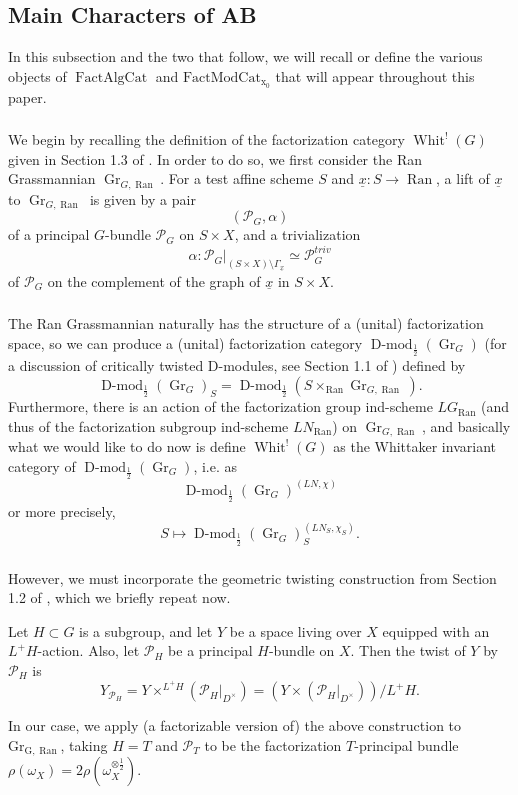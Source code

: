 \documentclass[10pt,a4paper]{amsart}
\newcommand{\on}[1]{\operatorname{#1}}
\newcommand{\Dmod}{\on{D-mod}}
\newcommand{\FactAlgCat}{\on{FactAlgCat}}
\newcommand{\FactModCat}{\on{FactModCat_{x_0}}}
\newcommand{\sssec}[1]{\subsubsection{}}
\begin{document}
\subsection{Main Characters of AB} \label{Main Characters of AB}
In this subsection and the two that follow, we will recall or define the various objects of $\FactAlgCat$ and $\FactModCat$ that will appear throughout this paper.

\sssec{}
We begin by recalling the definition of the factorization category $\on{Whit}^!(G)$ given in Section 1.3 of \cite{GLC2}. In order to do so, we first consider the Ran Grassmannian $\on{Gr}_{G, \on{Ran}}$. For a test affine scheme $S$ and $\underline{x} : S \to \on{Ran}$, a lift of $\underline{x}$ to $\on{Gr}_{G, \on{Ran}}$ is given by a pair
$$
(\mathcal{P}_G, \alpha)
$$
of a principal $G$-bundle $\mathcal{P}_G$ on $S \times X$, and a trivialization
$$
\alpha: \mathcal{P}_G|_{(S \times X) \setminus \Gamma_{\underline{x}}} \simeq \mathcal{P}_G^{triv}
$$
of $\mathcal{P}_G$ on the complement of the graph of $\underline{x}$ in $S \times X$.

\sssec{}
The Ran Grassmannian naturally has the structure of a (unital) factorization space, so we can produce a (unital) factorization category $\Dmod_{\frac{1}{2}}(\on{Gr}_G)$ (for a discussion of critically twisted D-modules, see Section 1.1 of \cite{GLC2}) defined by
$$
    \Dmod_{\frac{1}{2}}(\on{Gr}_G)_S = \Dmod_{\frac{1}{2}}(S \times_{\on{Ran}} \on{Gr}_{G, \on{Ran}}).
$$
Furthermore, there is an action of the factorization group ind-scheme $LG_{\on{Ran}}$ (and thus of the factorization subgroup ind-scheme $LN_{\on{Ran}}$) on $\on{Gr}_{G, \on{Ran}}$, and basically what we would like to do now is define $\on{Whit}^!(G)$ as the Whittaker invariant category of $\Dmod_{\frac{1}{2}}(\on{Gr}_G)$, i.e. as
$$
\Dmod_{\frac{1}{2}}(\on{Gr}_G)^{(LN, \chi)}
$$
or more precisely,
$$
S \mapsto \Dmod_{\frac{1}{2}}(\on{Gr}_G)_S^{(LN_S, \chi_S)}.
$$

\sssec{}
However, we must incorporate the geometric twisting construction from Section 1.2 of \cite{GLC2}, which we briefly repeat now.

Let $H \subset G$ is a subgroup, and let $Y$ be a space living over $X$ equipped with an $L^+H$-action. Also, let $\mathcal{P}_H$ be a principal $H$-bundle on $X$. Then the twist of $Y$ by $\mathcal{P}_H$ is
$$
    Y_{\mathcal{P}_H} = Y \times^{L^+H} (\mathcal{P}_H|_{D^\times}) = (Y \times (\mathcal{P}_H|_{D^\times}))/L^+H.
$$

In our case, we apply (a factorizable version of) the above construction to $\on{Gr_{G, \on{Ran}}}$, taking $H = T$ and $\mathcal{P}_T$ to be the factorization $T$-principal bundle $\rho(\omega_X) = 2\rho(\omega_X^{\otimes \frac{1}{2}})$.
\end{document}
